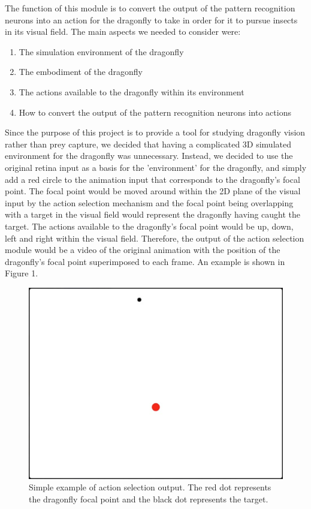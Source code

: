 \documentclass[a4paper,11pt]{article}
\begin{document}
The function of this module is to convert the output of the pattern recognition neurons into an action for the dragonfly to take in order for it to pursue insects in its visual field.
The main aspects we needed to consider were:
\begin{enumerate}
	\item The simulation environment of the dragonfly
	\item The embodiment of the dragonfly
	\item The actions available to the dragonfly within its environment
	\item How to convert the output of the pattern recognition neurons into actions
\end{enumerate}
Since the purpose of this project is to provide a tool for studying dragonfly vision rather than prey capture, we decided that having a complicated 3D simulated environment for the dragonfly was unnecessary. Instead, we decided to use the original retina input as a basis for the 'environment' for the dragonfly, and simply add a red circle to the animation input that corresponds to the dragonfly's focal point. The focal point would be moved around within the 2D plane of the visual input by the action selection mechanism and the focal point being overlapping with a target in the visual field would represent the dragonfly having caught the target. The actions available to the dragonfly's focal point would be up, down, left and right within the visual field. Therefore, the output of the action selection module would be a video of the original animation with the position of the dragonfly's focal point superimposed to each frame. An example is shown in Figure 1.

\begin{figure}[h]
\centering
\includegraphics[scale = 0.3]{as_example}
\caption{Simple example of action selection output. The red dot represents the dragonfly focal point and the black dot represents the target.}
\end{figure}
\end{document}

